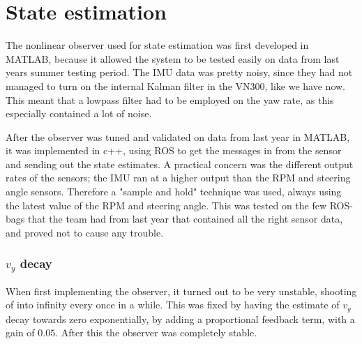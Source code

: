 \section{State estimation}

The nonlinear observer used for state estimation was first developed in MATLAB, because it allowed the system to be tested easily on data from last years summer testing period. The IMU data was pretty noisy, since they had not managed to turn on the internal Kalman filter in the VN300, like we have now. This meant that a lowpass filter had to be employed on the yaw rate, as this especially contained a lot of noise. 

After the observer was tuned and validated on data from last year in MATLAB, it was implemented in c++, using ROS to get the messages in from the sensor and sending out the state estimates. A practical concern was the different output rates of the sensors; the IMU ran at a higher output than the RPM and steering angle sensors. Therefore a "sample and hold" technique was used, always using the latest value of the RPM and steering angle. This was tested on the few ROS-bags that the team had from last year that contained all the right sensor data, and proved not to cause any trouble.  

\subsubsection{$v_y$ decay}

When first implementing the observer, it turned out to be very unstable, shooting of into infinity every once in a while. This was fixed by having the estimate of $v_y$ decay towards zero exponentially, by adding a proportional feedback term, with a gain of $0.05$. After this the observer was completely stable.